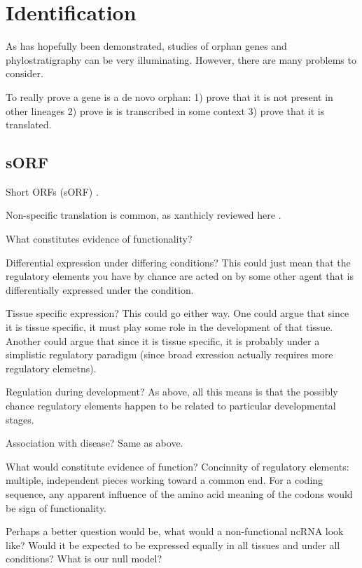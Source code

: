 \section{Identification}

    As has hopefully been demonstrated, studies of orphan genes and
    phylostratigraphy can be very illuminating. However, there are many
    problems to consider.

    To really prove a gene is a de novo orphan: 1) prove that it is not present
    in other lineages 2) prove is is transcribed in some context 3) prove that
    it is translated.

\subsection{sORF}

  Short ORFs (sORF) \cite{kageyama_coding_2011}.

  Non-specific translation is common, as xanthicly reviewed here
  \cite{wilusz_long_2009}.

  What constitutes evidence of functionality?

  Differential expression under differing conditions? This could just mean that
  the regulatory elements you have by chance are acted on by some other agent
  that is differentially expressed under the condition.

  Tissue specific expression? This could go either way. One could argue that
  since it is tissue specific, it must play some role in the development of that
  tissue. Another could argue that since it is tissue specific, it is probably
  under a simplistic regulatory paradigm (since broad exression actually requires
  more regulatory elemetns).

  Regulation during development? As above, all this means is that the possibly
  chance regulatory elements happen to be related to particular developmental
  stages.

  Association with disease? Same as above.

  What would constitute evidence of function? Concinnity of regulatory elements:
  multiple, independent pieces working toward a common end. For a coding
  sequence, any apparent influence of the amino acid meaning of the codons would
  be sign of functionality.

  Perhaps a better question would be, what would a non-functional ncRNA look
  like? Would it be expected to be expressed equally in all tissues and under all
  conditions? What is our null model?

